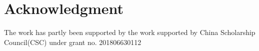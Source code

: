 \section{Acknowledgment}
The work has partly been supported by the work supported by China Scholarship
Council(CSC) under grant no. 201806630112
